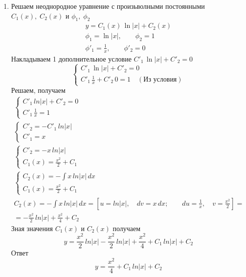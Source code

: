 \begin{Example}
\begin{enumerate}
        \item Решаем неоднородное уравнение с произьволными постоянными $C_1(x),\; C_2(x)$ и $\phi_1,\; \phi_2$
        \begin{gather*}
            y = C_1(x)\,\ln|x| + C_2(x)\\
            \phi_1 = \ln|x|, \qquad \phi_2 = 1\\
            \phi'_1 = \frac{1}{x}, \qquad \phi'_2 = 0
        \end{gather*} 
        Накладываем 1 дополнительное условие $C'_1\,\ln|x| + C'_2 = 0$\\
        \[
            \begin{cases}
                C'_1\,\ln|x| + C'_2 = 0\\
                C'_1\,\frac{1}{x} + C'_2\,0 = 1 \quad (\text{Из условия})
            \end{cases}
        \]
        Решаем, получаем
        \begin{gather*}
            \begin{cases}  
                C'_1\,ln|x| + C'_2 = 0\\
                C'_1\,\frac{1}{x} = 1
            \end{cases}\\
            \begin{cases}  
            C'_2 = - C'_1\,ln|x|\\
            C'_1 = x
            \end{cases}\\
            \begin{cases}  
            C'_2 = - x\,ln|x|\\
            C_1(x) = \frac{x^2}{2} + C_1
            \end{cases}\\
            \begin{cases}  
            C_2(x) = -\int x\,ln|x|\,dx\\
            C_1(x) = \frac{x^2}{2} + C_1
            \end{cases}\\
            C_2(x) = -\int x\,ln|x|\,dx = \left[u = ln|x|, \quad dv = x\,dx; \qquad du = \frac{1}{x}, \quad v = \frac{x^2}{2}\right] = \\
            = - \frac{x^2}{2}\,ln|x| + \frac{x^2}{4} + C_2
        \end{gather*}
        Зная значения $C_1(x)$ и $C_2(x)$ получаем
        \[
            y = \frac{x^2}{2}\,ln|x| - \frac{x^2}{2}\,ln|x| + \frac{x^2}{4} + C_1\,ln|x| + C_2
        \]
        Ответ
        \[
            y = \frac{x^2}{4} + C_1\,ln|x| + C_2
        \]
    \end{enumerate}
\end{Example}